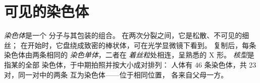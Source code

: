 \section{可见的染色体}

\begin{definition}\label{def:g11:cell-cycle-mitosis:chromosome}
\emph{染色体}是一个  分子与其包装的组合。
在两次分裂之间，它是松散、不可见的细丝；
在开始时，它盘绕成致密的棒状体，可在光学显微镜下看到。
复制后，每条染色体由两条相同的
\emph{染色单体}，二者在
\emph{着丝粒}处相连，呈熟悉的 X 形。
\emph{核型}是指某的全部
染色体，于中期拍照并按大小成对排列：
人体有 46 条染色体，共 23 对，同一对中的两条
互为\emph{}染色体——位于相同位置，
各来自父母一方。
\end{definition}

